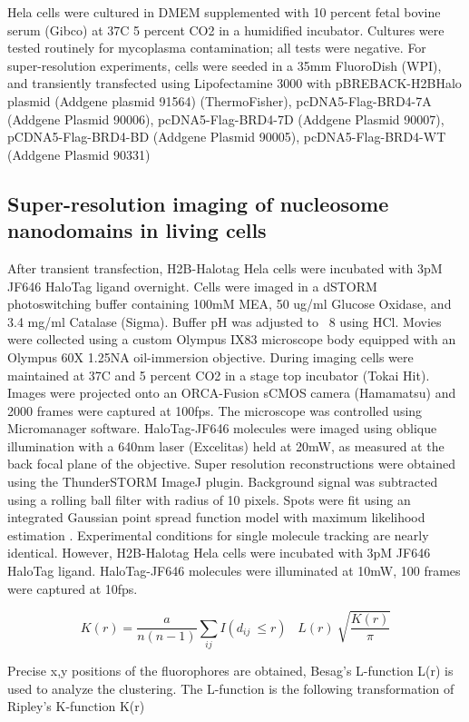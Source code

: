 Hela cells were cultured in DMEM supplemented with 10 percent fetal bovine serum (Gibco) at 37C 5 percent CO2 in a humidified incubator. Cultures were tested routinely for mycoplasma contamination; all tests were negative. For super-resolution experiments, cells were seeded in a 35mm FluoroDish (WPI), and transiently transfected using Lipofectamine 3000 with pBREBACK-H2BHalo plasmid (Addgene plasmid 91564) (ThermoFisher), pcDNA5-Flag-BRD4-7A (Addgene Plasmid 90006), pcDNA5-Flag-BRD4-7D (Addgene Plasmid 90007), pCDNA5-Flag-BRD4-BD (Addgene Plasmid 90005), pcDNA5-Flag-BRD4-WT (Addgene Plasmid 90331)

\subsection{Super-resolution imaging of nucleosome nanodomains in living cells}

After transient transfection, H2B-Halotag Hela cells were incubated with 3pM JF646 HaloTag ligand overnight. Cells were imaged in a dSTORM photoswitching buffer containing 100mM MEA, 50 ug/ml Glucose Oxidase, and 3.4 mg/ml Catalase (Sigma). Buffer pH was adjusted to ~8 using HCl. Movies were collected using a custom Olympus IX83 microscope body equipped with an Olympus 60X 1.25NA oil-immersion objective. During imaging cells were maintained at 37C and 5 percent CO2 in a stage top incubator (Tokai Hit). Images were projected onto an ORCA-Fusion sCMOS camera (Hamamatsu) and 2000 frames were captured at 100fps. The microscope was controlled using Micromanager software. HaloTag-JF646 molecules were imaged using oblique illumination with a 640nm laser (Excelitas) held at 20mW, as measured at the back focal plane of the objective. Super resolution reconstructions were obtained using the ThunderSTORM ImageJ plugin. Background signal was subtracted using a rolling ball filter with radius of 10 pixels. Spots were fit using an integrated Gaussian point spread function model with maximum likelihood estimation \parencite{Smith2010,Huang2013}. Experimental conditions for single molecule tracking are nearly identical. However, H2B-Halotag Hela cells were incubated with 3pM JF646 HaloTag ligand. HaloTag-JF646 molecules were illuminated at 10mW, 100 frames were captured at 10fps. 

\begin{equation*}
K(r) =\frac{a}{n(n-1)}\sum_{ij}{I(d_{ij}\ \le r)}\;\;\; L(r)\ \sqrt{\frac{K(r)}{\pi}}
\end{equation*}

Precise x,y positions of the fluorophores are obtained, Besag’s L-function L(r) is used to analyze the clustering. The L-function is the following transformation of Ripley’s K-function K(r) 



